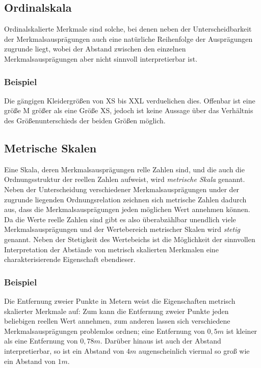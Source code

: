 \documentclass[a4paper]{scrartcl}
\begin{document}
\begin{multicols}{2}
                \subsection{Ordinalskala}
                    Ordinalskalierte Merkmale sind solche, bei denen neben der Unterscheidbarkeit der Merkmalsausprägungen auch eine natürliche Reihenfolge der Ausprägungen zugrunde liegt, wobei der Abstand zwischen den einzelnen Merkmalsausprägungen aber nicht sinnvoll interpretierbar ist. \cite{kohn2005}
                    \subsubsection{Beispiel}
                        Die gängigen Kleidergrößen von XS bis XXL verduelichen dies. Offenbar ist eine größe M größer als eine Größe XS, jedoch ist keine Aussage über das Verhältnis des Größenunterschieds der beiden Größen möglich.
                \subsection{Metrische Skalen}
                    Eine Skala, deren Merkmalsausprägungen relle Zahlen sind, und die auch die Ordnungsstruktur der reellen Zahlen aufweist, wird \emph{metrische Skala} genannt. Neben der Unterscheidung verschiedener Merkmalsausprägungen under der zugrunde liegenden Ordnungsrelation zeichnen sich metrische Zahlen dadurch aus, dass die Merkmalsausprägungen jeden möglichen Wert annehmen können. Da die Werte reelle Zahlen sind gibt es also überabzählbar unendlich viele Merkmalsausprägungen und der Wertebereich metrischer Skalen wird \emph{stetig} genannt. Neben der Stetigkeit des Wertebeichs ist die Möglichkeit der sinnvollen Interpretation der Abstände von metrisch skalierten Merkmalen eine charakterisierende Eigenschaft ebendieser.
                    \cite{kohn2005}
                    \subsubsection{Beispiel}
                        Die Entfernung zweier Punkte in Metern weist die Eigenschaften metrisch skalierter Merkmale auf: Zum kann die Entfernung zweier Punkte jeden beliebigen reellen Wert annehmen, zum anderen lassen sich verschiedene Merkmalsausprägungen problemlos ordnen; eine Entfernung von $ 0,5m $ ist kleiner als eine Entfernung von $ 0,78m $. Darüber hinaus ist auch der Abstand interpretierbar, so ist ein Abstand von $4m$ augenscheinlich viermal so groß wie ein Abstand von $1m$.

\end{multicols}
\end{document}
